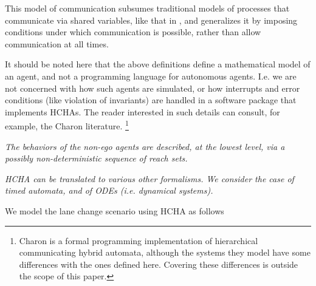 This model of communication subsumes traditional models of processes that communicate via shared variables, like that in , and generalizes it by imposing conditions under which communication is possible, rather than allow communication at all times.

It should be noted here that the above definitions define a mathematical model of an agent, and not a programming language for autonomous agents. 
I.e. we are not concerned with how such agents are simulated, or how interrupts and error conditions (like violation of invariants) are handled in a software package that implements HCHAs.
The reader interested in such details can consult, for example, the Charon literature.
\footnote{Charon is a formal programming implementation of hierarchical communicating hybrid automata, although the systems they model have some differences with the ones defined here. Covering these differences is outside the scope of this paper.}

{\it The behaviors of the non-ego agents are described, at the lowest level, via a possibly non-deterministic sequence of reach sets.}

{\it HCHA can be translated to various other formalisms. We consider the case of timed automata, and of ODEs (i.e. dynamical systems).}

\begin{exmp}
	We model the lane change scenario using HCHA as follows
	\end{exmp}
